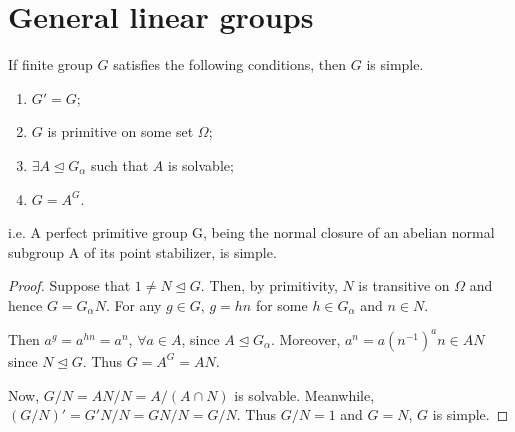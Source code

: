 \documentclass[a4paper,11pt]{article}
\def\maintitle#1{\section*{#1}}
\def\subtitle#1{\section{#1}}
\begin{document}
\else %
    \ifx\chaptitle\undefined %
        \def\maintitle#1{\subsection{#1}}
        \def\subtitle#1{\subsubsection{#1}}
    \else %
        \def\maintitle#1{\section{#1}}
        \def\subtitle#1{\subsection{#1}}
    \fi
\fi

\maintitle{General linear groups}





\begin{lemma}[Iwasawa]
    If finite group $G$ satisfies the following conditions, then $G$ is simple.
    \begin{enumerate}[itemsep=0pt,label=\roman*.]
        \item $G'=G$;
        \item $G$ is primitive on some set $\Omega$;
        \item $\exists A\trianglelefteq G_\alpha$ such that $A$ is solvable;
        \item $G=A^G$.
    \end{enumerate}
    i.e. A perfect primitive group G, being the normal
    closure of an abelian normal subgroup A of its point stabilizer, is simple.
\end{lemma}
\begin{proof}
    Suppose that $1\neq N\trianglelefteq G$. Then, by primitivity, $N$ is transitive on $\Omega$ and hence $G=G_\alpha N$. For any $g\in G$, $g=hn$ for some $h\in G_\alpha$ and $n\in N$. 
    
    Then $a^g=a^{hn}=a^n$, $\forall a\in A$, since $A\trianglelefteq G_\alpha$. Moreover, $a^n=a(n^{-1})^{a}n\in AN$ since $N\trianglelefteq G$. Thus $G=A^G= AN$.

    Now, $G/N=AN/N=A/(A\cap N)$ is solvable. Meanwhile, $(G/N)'=G'N/N=GN/N=G/N$. Thus $G/N=1$ and $G=N$, $G$ is simple.
\end{proof}



\ifx\ChapThreeSecThree\undefined %
     
\end{document}
